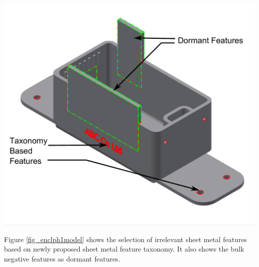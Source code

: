 


\begin{minipage}{\linewidth}
\begin{minipage}[c]{0.62\linewidth}
\includegraphics[width=\linewidth,valign=t]{images/SheetMetal_Medium_Enclosure_PhaseISelections_2}

 \label{fig_enclph1model}

\bigskip

Figure \ref{fig_enclph1model} shows the selection of irrelevant sheet metal features based on newly proposed sheet metal feature taxonomy. It also shows the bulk negative features as dormant features.  %


\end{minipage}
\end{minipage}
